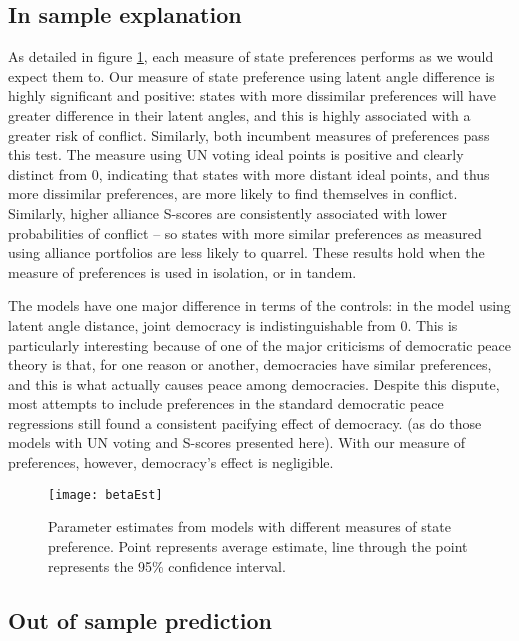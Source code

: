 \subsection*{In sample explanation}

As detailed in figure \ref{fig:coefP}, each measure of state preferences performs as we would expect them to. Our measure of state preference using latent angle difference is highly significant and positive: states with more dissimilar preferences will have greater difference in their latent angles, and this is highly associated with a greater risk of conflict. Similarly, both incumbent measures of preferences pass this test. The measure using UN voting ideal points is positive and clearly distinct from $0$, indicating that states with more distant ideal points, and thus more dissimilar preferences, are more likely to find themselves in conflict. Similarly, higher alliance S-scores are consistently associated with lower probabilities of conflict -- so states with more similar preferences as measured using alliance portfolios are less likely to quarrel. These results hold when the measure of preferences is used in isolation, or in tandem.

The models have one major difference in terms of the controls: in the model using latent angle distance, joint democracy is indistinguishable from $0$. This is particularly interesting because of one of the major criticisms of democratic peace theory is that, for one reason or another, democracies have similar preferences, and this is what actually causes peace among democracies.  Despite this dispute, most attempts to include preferences in the standard democratic peace regressions still found a consistent pacifying effect of democracy.
(as do those models with UN voting and S-scores presented here). With our measure of preferences, however, democracy's effect is negligible.


\begin{figure}[ht]
	\centering
	\texttt{[image: betaEst]}
	\caption{Parameter estimates from models with different measures of state preference. Point represents average estimate, line through the point represents the 95\% confidence interval.}
	\label{fig:coefP}
\end{figure}
\FloatBarrier

\subsection*{Out of sample prediction}

